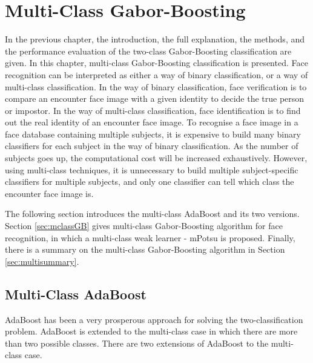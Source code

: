 \chapter{Multi-Class Gabor-Boosting}
\label{ch:multi}
In the previous chapter, the introduction, the full explanation, the methods, and the performance evaluation of the two-class Gabor-Boosting classification are given. In this chapter, multi-class Gabor-Boosting classification is presented. Face recognition can be interpreted as either a way of binary classification, or a way of multi-class classification. In the way of binary classification, face verification is to compare an encounter face image with a given identity to decide the true person or impostor. In the way of multi-class classification, face identification is to find out the real identity of an encounter face image. To recognise a face image in a face database containing multiple subjects, it is expensive to build many binary classifiers for each subject in the way of binary classification. As the number of subjects goes up, the computational cost will be increased exhaustively. However, using multi-class techniques, it is unnecessary to build multiple subject-specific classifiers for multiple subjects, and only one classifier can tell which class the encounter face image is.

The following section introduces the multi-class AdaBoost and its two versions. \mbox{Section} \ref{sec:mclassGB} gives multi-class Gabor-Boosting algorithm for face recognition, in which a multi-class weak learner - mPotsu is proposed. Finally, there is a summary on the multi-class Gabor-Boosting algorithm in \mbox{Section} \ref{sec:multisummary}.
\section{Multi-Class AdaBoost}
AdaBoost has been a very prosperous approach for solving the two-classification problem. AdaBoost is extended to the multi-class case in which there are more than two possible classes. There are two extensions of AdaBoost to the multi-class case.

